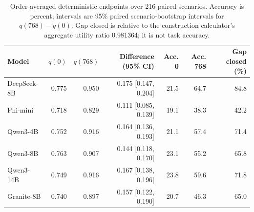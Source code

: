 \begin{table}[t]
\centering
\caption{Order-averaged deterministic endpoints over 216 paired scenarios. Accuracy is percent; intervals are 95\% paired scenario-bootstrap intervals for $q(768)-q(0)$. Gap closed is relative to the construction calculator's aggregate utility ratio 0.981364; it is not task accuracy.}
\label{tab:endpoints}
\small
\setlength{\tabcolsep}{3.5pt}
\begin{tabular}{lrrrrrr}
\toprule
Model & $q(0)$ & $q(768)$ & Difference (95\% CI) & Acc. 0 & Acc. 768 & Gap closed (\%) \\
\midrule
DeepSeek-8B & 0.775 & 0.950 & 0.175 [0.147, 0.204] & 21.5 & 64.7 & 84.8 \\
Phi-mini & 0.718 & 0.829 & 0.111 [0.085, 0.139] & 19.1 & 38.3 & 42.2 \\
Qwen3-4B & 0.752 & 0.916 & 0.164 [0.136, 0.193] & 21.1 & 57.4 & 71.4 \\
Qwen3-8B & 0.763 & 0.907 & 0.144 [0.118, 0.170] & 23.1 & 55.2 & 65.8 \\
Qwen3-14B & 0.749 & 0.916 & 0.167 [0.138, 0.196] & 23.8 & 59.6 & 71.8 \\
Granite-8B & 0.740 & 0.897 & 0.157 [0.122, 0.190] & 20.7 & 46.3 & 65.0 \\
\bottomrule
\end{tabular}
\end{table}
